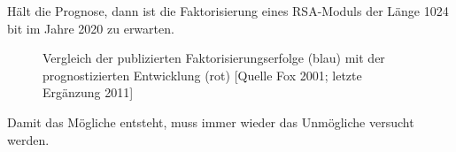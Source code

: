 \begin{refsegment}
Hält die Prognose, dann ist die Faktorisierung eines RSA-Moduls der Länge
1024 bit im Jahre 2020 zu erwarten.

\begin{figure}[ht] %
\begin{center}
\caption{Vergleich der publizierten Faktorisierungserfolge (blau) mit der
prognostizierten Entwicklung (rot) [Quelle Fox 2001; letzte Ergänzung 2011]}
\label{secorvo-factorisation-forecast}
\end{center}
\end{figure}




\clearpage  %
\begin{ctsquote}
    Damit das Mögliche entsteht, muss immer wieder das Unmögliche
    versucht werden.
\caption[Hermann Hesse]{Hermann Hesse\footnotemark}
\end{ctsquote}
\addtocounter{footnote}{0}


\end{refsegment}
